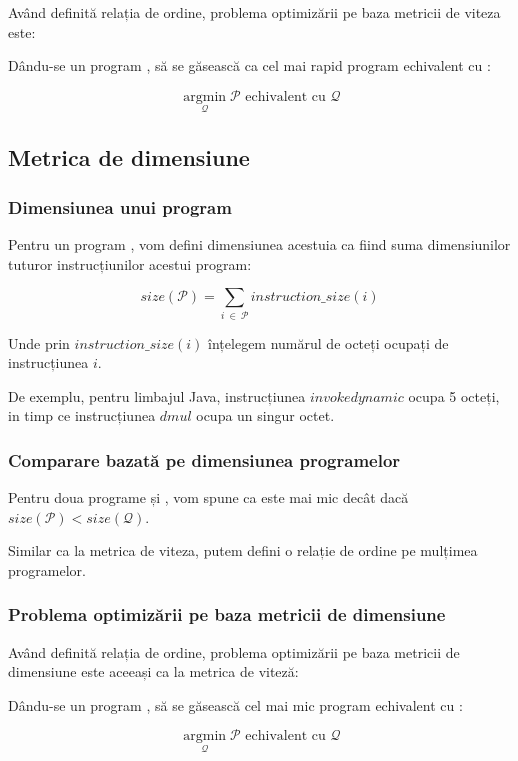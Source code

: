 Având definită relația de ordine, problema optimizării pe
baza metricii de viteza este:

Dându-se un program , să se găsească  ca cel mai rapid
program echivalent cu :

\[
	\operatorname*{argmin}_\mathcal{Q} \mathcal{P}
	\text{ echivalent cu  } \mathcal{Q}
\]

\subsection{Metrica de dimensiune}

\subsubsection{Dimensiunea unui program}

Pentru un program , vom defini dimensiunea acestuia ca fiind
suma dimensiunilor tuturor instrucțiunilor acestui program:

\[
	size(\mathcal{P}) = \sum_{i\ \in\ \mathcal{P}} instruction\_size(i)
\]

Unde prin \( instruction\_size(i) \) înțelegem numărul de octeți
ocupați de instrucțiunea $i$.

De exemplu, pentru limbajul Java, instrucțiunea $invokedynamic$
ocupa 5 octeți, in timp ce instrucțiunea $dmul$ ocupa un singur
octet.

\subsubsection{Comparare bazată pe dimensiunea programelor}

Pentru doua programe  și , vom spune ca  este mai
mic decât  dacă \(size(\mathcal{P}) < size(\mathcal{Q})\).

Similar ca la metrica de viteza, putem defini o relație de ordine
pe mulțimea programelor.

\subsubsection{Problema optimizării pe baza metricii de
	dimensiune}

Având definită relația de ordine, problema optimizării pe
baza metricii de dimensiune este aceeași ca la metrica de viteză:

Dându-se un program , să se găsească  cel mai mic
program echivalent cu :

\[
	\operatorname*{argmin}_\mathcal{Q} \mathcal{P}
	\text{ echivalent cu  } \mathcal{Q}
\]

